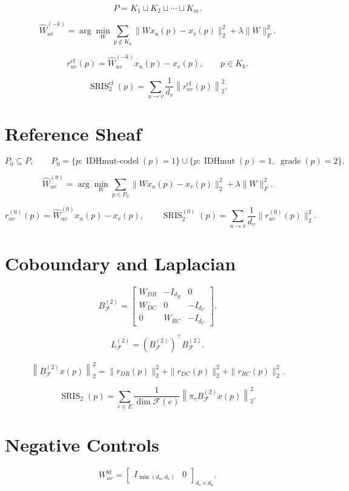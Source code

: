\documentclass[11pt]{article}
\begin{document}
\[
P=K_1\sqcup K_2\sqcup\cdots\sqcup K_m.
\]

\[
\widehat W_{uv}^{(-k)}
=\arg\min_W
\sum_{p\notin K_k}\|Wx_u(p)-x_v(p)\|_2^2+
\lambda\|W\|_F^2.
\]

\[
 r_{uv}^{\mathrm{cf}}(p)=\widehat W_{uv}^{(-k)}x_u(p)-x_v(p),
\qquad p\in K_k.
\]

\[
\operatorname{SRIS}_{2}^{\mathrm{cf}}(p)
=
\sum_{u\to v}\frac{1}{d_v}\left\|r_{uv}^{\mathrm{cf}}(p)\right\|_2^2.
\]

\section*{Reference Sheaf}

\[
P_0\subseteq P,
\qquad
P_0=\{p:\operatorname{IDHmut\text{-}codel}(p)=1\}\cup
\{p:\operatorname{IDHmut}(p)=1,\;\operatorname{grade}(p)=2\}.
\]

\[
\widehat W_{uv}^{(0)}
=\arg\min_W
\sum_{p\in P_0}\|Wx_u(p)-x_v(p)\|_2^2+\lambda\|W\|_F^2.
\]

\[
 r_{uv}^{(0)}(p)=\widehat W_{uv}^{(0)}x_u(p)-x_v(p),
\qquad
\operatorname{SRIS}_{2}^{(0)}(p)=
\sum_{u\to v}\frac{1}{d_v}\|r_{uv}^{(0)}(p)\|_2^2.
\]

\section*{Coboundary and Laplacian}

\[
B_{\mathcal F}^{(2)}=
\begin{bmatrix}
 W_{DR} & -I_{d_R} & 0\\
 W_{DC} & 0 & -I_{d_C}\\
 0 & W_{RC} & -I_{d_C}
\end{bmatrix}.
\]

\[
L_{\mathcal F}^{(2)}=(B_{\mathcal F}^{(2)})^\top B_{\mathcal F}^{(2)}.
\]

\[
\left\|B_{\mathcal F}^{(2)}x(p)\right\|_2^2
=
\|r_{DR}(p)\|_2^2+
\|r_{DC}(p)\|_2^2+
\|r_{RC}(p)\|_2^2.
\]

\[
\operatorname{SRIS}_{2}(p)
=
\sum_{e\in E}\frac{1}{\dim\mathcal F(e)}
\left\|\pi_eB_{\mathcal F}^{(2)}x(p)\right\|_2^2.
\]

\section*{Negative Controls}

\[
W_{uv}^{\mathrm{id}}=
\begin{bmatrix}
I_{\min(d_u,d_v)} & 0
\end{bmatrix}_{d_v\times d_u}.
\]
\end{document}
